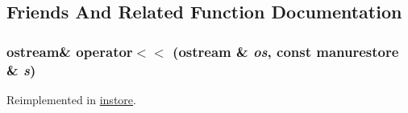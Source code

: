 \subsection{Friends And Related Function Documentation}
\hypertarget{classmanurestore_a8ac9597914271cef193878847c073724}{
\subsubsection[{operator$<$$<$}]{\setlength{\rightskip}{0pt plus 5cm}ostream\& operator$<$$<$ (ostream \& {\em os}, \/  const {\bf manurestore} \& {\em s})}}
\label{classmanurestore_a8ac9597914271cef193878847c073724}


Reimplemented in \hyperlink{classinstore_a2ff66b6c5bc714a61ac6aeeebf9b2519}{instore}.

